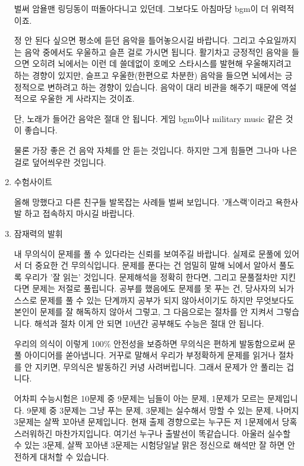 \begin{enumerate}
    벌써 암욜맨 링딩동이 떠돌아다니고 있던데. 그보다도 아침마당 bgm이 더 위력적이죠.
    \vspace{5mm}

    정 안 된다 싶으면 평소에 듣던 음악을 틀어놓으시길 바랍니다.
    그리고 수요일까지는 음악 중에서도 우울하고 슬픈 걸로 가시면 됩니다.
    활기차고 긍정적인 음악을 들으면 오히려 뇌에서는 이런 데 쓸데없이 호메오 스타시스를 발현해 우울해지려고 하는 경향이 있지만,
    슬프고 우울한(한편으로 차분한) 음악을 들으면 뇌에서는 긍정적으로 변하려고 하는 경향이 있습니다.
    음악이 대리 비관을 해주기 때문에 역설적으로 우울한 게 사라지는 것이죠.
    \vspace{5mm}

    단, 노래가 들어간 음악은 절대 안 됩니다.
    게임 bgm이나 military music 같은 것이 좋습니다.
    \vspace{5mm}

    물론 가장 좋은 건 음악 자체를 안 듣는 것입니다. 하지만 그게 힘들면 그나마 나은 걸로 덮어씌우란 것입니다.
    \vspace{5mm}

    \item 수험사이트
    \vspace{5mm}

    올해 망했다고 다른 친구들 발목잡는 사례들 벌써 보입니다.
    '개스랙'이라고 욕한사발 하고 접속하지 마시길 바랍니다.
    \vspace{5mm}

    \item 잠재력의 발휘
    \vspace{5mm}

    내 무의식이 문제를 풀 수 있다라는 신뢰를 보여주길 바랍니다.
    실제로 문풀에 있어서 더 중요한 건 무의식입니다. 문제를 푼다는 건 엄밀히 말해 뇌에서 알아서 풀도록 우리가 '잘 읽는' 것입니다.
    문제해석을 정확히 한다면, 그리고 문풀절차만 지킨다면 문제는 저절로 풀립니다.
    공부를 했음에도 문제를 못 푸는 건, 당사자의 뇌가 스스로 문제를 풀 수 있는 단계까지 공부가 되지 않아서이기도 하지만
    무엇보다도 본인이 문제를 잘 해독하지 않아서 그렇고, 그 다음으로는 절차를 안 지켜서 그렇습니다.
    해석과 절차 이게 안 되면 10년간 공부해도 수능은 절대 안 됩니다.
    \vspace{5mm}

    우리의 의식이 이렇게 100$\%$ 안전성을 보증하면 무의식은 편하게 발동함으로써 문풀 아이디어를 쏟아냅니다.
    거꾸로 말해서 우리가 부정확하게 문제를 읽거나 절차를 안 지키면, 무의식은 발동하긴 커녕 사려버립니다. 그래서 문제가 안 풀리는 겁니다.
    \vspace{5mm}

    어차피 수능시험은 10문제 중 9문제는 님들이 아는 문제, 1문제가 모르는 문제입니다.
    9문제 중 3문제는 그냥 푸는 문제, 3문제는 실수해서 망할 수 있는 문제, 나머지 3문제는 살짝 꼬아낸 문제입니다.
    현재 출제 경향으로는 누구든 저 1문제에서 당혹스러워하긴 마찬가지입니다. 여기선 누구나 출발선이 똑같습니다.
    아울러 실수할 수 있는 3문제, 살짝 꼬아낸 3문제는 시험당일날 맑은 정신으로 해석만 잘 하면 안전하게 대처할 수 있습니다.
    \vspace{5mm}

\end{enumerate}


